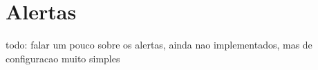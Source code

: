 



\section{Alertas}

todo: falar um pouco sobre os alertas, ainda nao implementados, mas de configuracao muito simples
